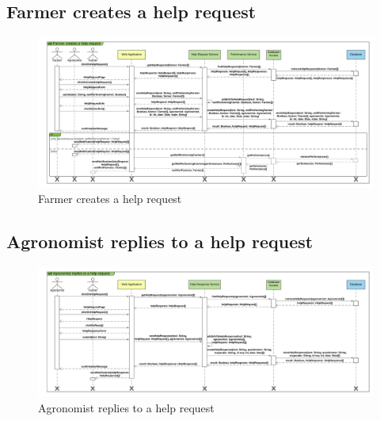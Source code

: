 \subsection{Farmer creates a help request}

\newpage
\begin{landscape}
\begin{figure}[h]
\vspace*{-2cm}
\noindent
\centering
\centerline{\includegraphics[scale= 0.108]{./Images/Sequence diagram/Farmer creates a help request.png}}
    \caption{Farmer creates a help request}
    \vspace*{-12cm}
\end{figure}
\fillandplacepagenumber
\end{landscape}

\subsection{Agronomist replies to a help request}

\newpage
\begin{landscape}
\begin{figure}[h]
\vspace*{-2cm}
\noindent
\centering
\centerline{\includegraphics[scale= 0.108]{./Images/Sequence diagram/Agronomist replies to a help request.png}}
    \caption{Agronomist replies to a help request}
    \vspace*{-12cm}
\end{figure}
\fillandplacepagenumber
\end{landscape}

